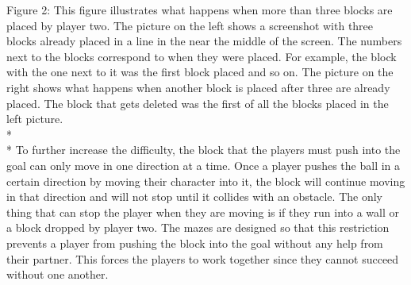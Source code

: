 Figure 2: This figure illustrates what happens when more than three blocks are placed by player two. The picture on the left shows a screenshot with three blocks already placed in a line in the near the middle of the screen. The numbers next to the blocks correspond to when they were placed. For example, the block with the one next to it was the first block placed and so on. The picture on the right shows what happens when another block is placed after three are already placed. The block that gets deleted was the first of all the blocks placed in the left picture.
\\*
\\*
To further increase the difficulty, the block that the players must push into the goal can only move in one direction at a time. Once a player pushes the ball in a certain direction by moving their character into it, the block will continue moving in that direction and will not stop until it collides with an obstacle. The only thing that can stop the player when they are moving is if they run into a wall or a block dropped by player two. The mazes are designed so that this restriction prevents a player from pushing the block into the goal without any help from their partner. This forces the players to work together since they cannot succeed without one another.